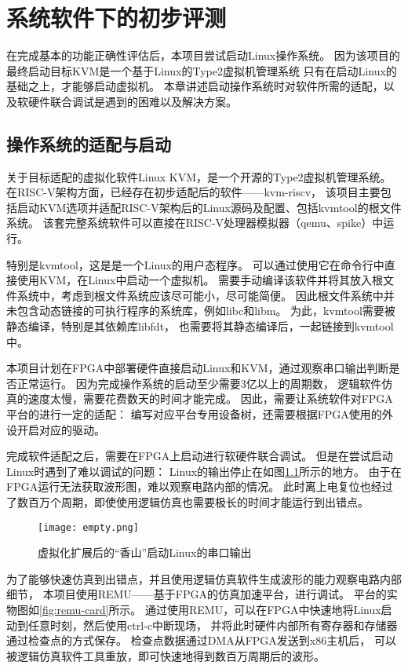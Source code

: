\chapter{系统软件下的初步评测}

在完成基本的功能正确性评估后，本项目尝试启动Linux操作系统。
因为该项目的最终启动目标KVM是一个基于Linux的Type2虚拟机管理系统
只有在启动Linux的基础之上，才能够启动虚拟机。
本章讲述启动操作系统时对软件所需的适配，以及软硬件联合调试是遇到的困难以及解决方案。

\section{操作系统的适配与启动}
关于目标适配的虚拟化软件Linux KVM，是一个开源的Type2虚拟机管理系统。
在RISC-V架构方面，已经存在初步适配后的软件——kvm-riscv\cite{github:riscv-kvm}，
该项目主要包括启动KVM选项并适配RISC-V架构后的Linux源码及配置、包括kvmtool的根文件系统。
该套完整系统软件可以直接在RISC-V处理器模拟器（qemu、spike）中运行。

特别是kvmtool，这是是一个Linux的用户态程序。
可以通过使用它在命令行中直接使用KVM，在Linux中启动一个虚拟机。
需要手动编译该软件并将其放入根文件系统中，考虑到根文件系统应该尽可能小，尽可能简便。
因此根文件系统中并未包含动态链接的可执行程序的系统库，例如libc和libm。
为此，kvmtool需要被静态编译，特别是其依赖库libfdt，
也需要将其静态编译后，一起链接到kvmtool中。

本项目计划在FPGA中部署硬件直接启动Linux和KVM，通过观察串口输出判断是否正常运行。
因为完成操作系统的启动至少需要3亿以上的周期数，
逻辑软件仿真的速度太慢，需要花费数天的时间才能完成。
因此，需要让系统软件对FPGA平台的进行一定的适配：
编写对应平台专用设备树，还需要根据FPGA使用的外设开启对应的驱动。

完成软件适配之后，需要在FPGA上启动进行软硬件联合调试。
但是在尝试启动Linux时遇到了难以调试的问题：
Linux的输出停止在如图\ref{fig:console-block}所示的地方。
由于在FPGA运行无法获取波形图，难以观察电路内部的情况。
此时离上电复位也经过了数百万个周期，即使使用逻辑仿真也需要极长的时间才能运行到出错点。

\begin{figure}[htbp]
    \centering
    \texttt{[image: empty.png]}
    \caption{虚拟化扩展后的“香山”启动Linux的串口输出}
    \label{fig:console-block}
\end{figure}

为了能够快速仿真到出错点，并且使用逻辑仿真软件生成波形的能力观察电路内部细节，
本项目使用REMU\cite{iccd2023remu}——基于FPGA的仿真加速平台，进行调试。
平台的实物图如\ref{fig:remu-card}所示。
通过使用REMU，可以在FPGA中快速地将Linux启动到任意时刻，然后使用ctrl-c中断现场，
并将此时硬件内部所有寄存器和存储器通过检查点的方式保存。
检查点数据通过DMA从FPGA发送到x86主机后，
可以被逻辑仿真软件工具重放，即可快速地得到数百万周期后的波形。



